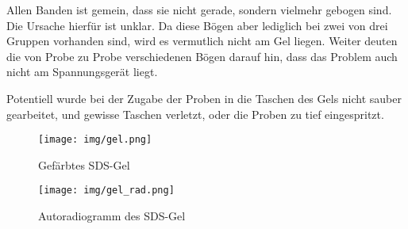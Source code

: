 \documentclass[a4paper,german]{scrreprt}
\begin{document}
Allen Banden ist gemein, dass sie nicht gerade, sondern vielmehr gebogen sind.
Die Ursache hierfür ist unklar. Da diese Bögen aber lediglich bei zwei von drei
Gruppen vorhanden sind, wird es vermutlich nicht am Gel liegen. Weiter deuten
die von Probe zu Probe verschiedenen Bögen darauf hin, dass das Problem auch
nicht am Spannungsgerät liegt.

Potentiell wurde bei der Zugabe der Proben in die Taschen des Gels nicht sauber
gearbeitet, und gewisse Taschen verletzt, oder die Proben zu tief eingespritzt.

\begin{figure}[h]
	\centering
	\texttt{[image: img/gel.png]}
	\caption{Gefärbtes SDS-Gel}
	\label{fig:gel}
\end{figure}

\begin{figure}[h]
	\centering
	\texttt{[image: img/gel\_rad.png]}
	\caption{Autoradiogramm des SDS-Gel}
	\label{fig:gel_rad}
\end{figure}



\end{document}
